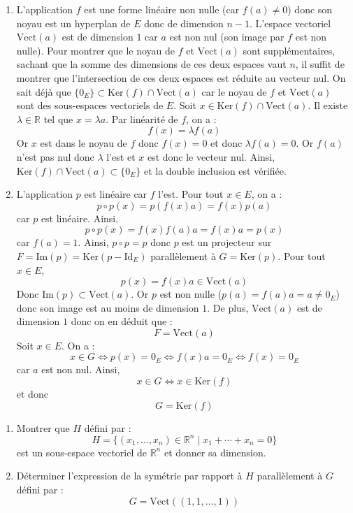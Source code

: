 \documentclass[a4paper,10pt]{report}
\begin{document}
\corr 

\begin{enumerate}
\item L'application $f$ est une forme linéaire non nulle (car $f(a) \neq 0$) donc son noyau est un hyperplan de $E$ donc de dimension $n-1$. L'espace vectoriel $\textrm{Vect}(a)$ est de dimension $1$ car $a$ est non nul (son image par $f$ est non nulle). Pour montrer que le noyau de $f$ et $\textrm{Vect}(a)$ sont supplémentaires, sachant que la somme des dimensions de ces deux espaces vaut $n$, il suffit de montrer que l'intersection de ces deux espaces est réduite au vecteur nul. On sait déjà que $\lbrace 0_E \rbrace \subset \textrm{Ker}(f) \cap \textrm{Vect}(a)$ car le noyau de $f$ et $\textrm{Vect}(a)$ sont des sous-espaces vectoriels de $E$. Soit $x \in \textrm{Ker}(f) \cap \textrm{Vect}(a)$. Il existe $\lambda \in \mathbb{R}$ tel que $x= \lambda a$. Par linéarité de $f$, on a :
$$ f(x) = \lambda f(a)$$
Or $x$ est dans le noyau de $f$ donc $f(x) = 0$ et donc $\lambda f(a) = 0$. Or $f(a)$ n'est pas nul donc $\lambda$ l'est et $x$ est donc le vecteur nul. Ainsi, $\textrm{Ker}(f) \cap \textrm{Vect}(a) \subset \lbrace 0_E \rbrace$ et la double inclusion est vérifiée.
\item L'application $p$ est linéaire car $f$ l'est. Pour tout $x \in E$, on a :
$$ p \circ p (x) = p(f(x) a) = f(x) p(a)$$
car $p$ est linéaire. Ainsi,
$$ p \circ p (x) = f(x) f(a) a = f(x) a = p(x)$$
car $f(a)=1$. Ainsi, $p \circ p=p$ donc $p$ est un projecteur sur $F= \textrm{Im}(p)= \textrm{Ker}(p- \textrm{Id}_E)$ parallèlement à $G = \textrm{Ker}(p)$. Pour tout $x \in E$,
$$ p(x) = f(x) a \in \textrm{Vect}(a)$$
Donc $\textrm{Im}(p) \subset \textrm{Vect}(a)$. Or $p$ est non nulle ($p(a)=f(a) a= a \neq 0_E$) donc son image est au moins de dimension $1$. De plus, $\textrm{Vect}(a)$ est de dimension $1$ donc on en déduit que :
$$ F = \textrm{Vect}(a)$$
Soit $x \in E$. On a :
$$ x \in G \Longleftrightarrow p(x) = 0_E \Longleftrightarrow f(x) a = 0_E \Longleftrightarrow f(x) = 0_E$$
car $a$ est non nul. Ainsi,
$$ x \in G \Longleftrightarrow x \in \textrm{Ker}(f)$$
et donc 
$$ G = \textrm{Ker}(f)$$
\end{enumerate}


\medskip


\begin{Exa} 
\begin{enumerate}
\item Montrer que $H$ défini par :
$$ H = \lbrace (x_1, \ldots, x_n)\in \mathbb{R}^n \; \vert \;    x_1 + \cdots + x_n = 0 \rbrace$$
est un sous-espace vectoriel de $\mathbb{R}^n$ et donner sa dimension.
\item Déterminer l'expression de la symétrie par rapport à $H$ parallèlement à $G$ défini par :
$$ G = \textrm{Vect}((1,1, \ldots, 1))$$
\end{enumerate}
\end{Exa}
\end{document}
